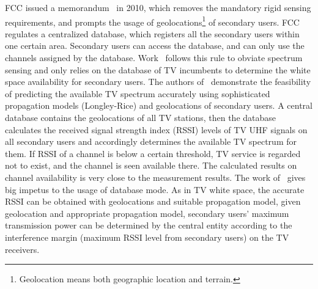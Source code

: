 FCC issued a memorandum~\cite{FCC_2010_sedond_memorandumm,FCCdatabasae} in 2010, which removes the mandatory rigid sensing requirements, and prompts the usage of geolocations\footnote{Geolocation means both geographic location and terrain.} of secondary users.
FCC regulates a centralized database, which registers all the secondary users within one certain area.
Secondary users can access the database, and can only use the channels assigned by the database.
Work~\cite{SenseLess2011} follows this rule to obviate spectrum sensing and only relies on the database of TV incumbents to determine the white space availability for secondary users. 
The authors of~\cite{SenseLess2011} demonstrate the feasibility of predicting the available TV spectrum accurately using sophisticated propagation models (Longley-Rice) and geolocations of secondary users. 
A central database contains the geolocations of all TV stations, then the database calculates the received signal strength index (\gls{RSSI}) levels of TV \gls{UHF} signals on all secondary users and accordingly determines the available TV spectrum for them. 
If RSSI of a channel is below a certain threshold, TV service is regarded not to exist, and the channel is seen available there.
The calculated results on channel availability is very close to the measurement results.
The work of~\cite{SenseLess2011} gives big impetus to the usage of database mode.
%
As in TV white space, the accurate RSSI can be obtained with geolocations and suitable propagation model, given geolocation and appropriate propagation model, secondary users' maximum transmission power can be determined by the central entity according to the interference margin (maximum RSSI level from secondary users) on the TV receivers. 


